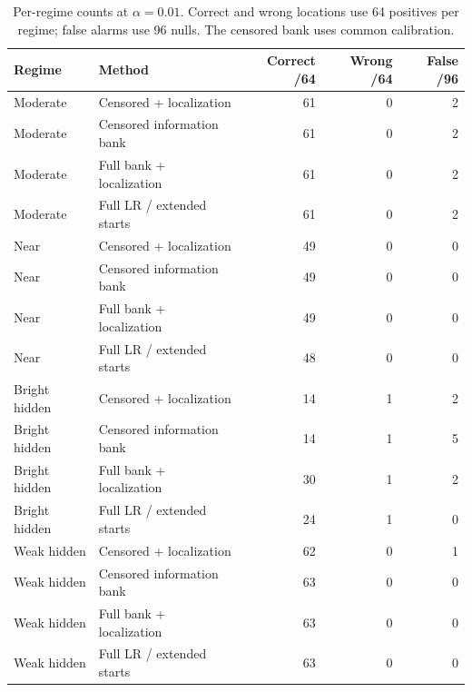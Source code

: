 \begin{table}[t]\centering
\caption{Per-regime counts at $\alpha=0.01$. Correct and wrong locations use 64 positives per regime; false alarms use 96 nulls. The censored bank uses common calibration.}
\label{tab:regime_results}
\begin{tabular}{llrrr}\toprule
Regime & Method & Correct /64 & Wrong /64 & False /96\\\midrule
Moderate & Censored + localization & 61 & 0 & 2\\
Moderate & Censored information bank & 61 & 0 & 2\\
Moderate & Full bank + localization & 61 & 0 & 2\\
Moderate & Full LR / extended starts & 61 & 0 & 2\\
Near & Censored + localization & 49 & 0 & 0\\
Near & Censored information bank & 49 & 0 & 0\\
Near & Full bank + localization & 49 & 0 & 0\\
Near & Full LR / extended starts & 48 & 0 & 0\\
Bright hidden & Censored + localization & 14 & 1 & 2\\
Bright hidden & Censored information bank & 14 & 1 & 5\\
Bright hidden & Full bank + localization & 30 & 1 & 2\\
Bright hidden & Full LR / extended starts & 24 & 1 & 0\\
Weak hidden & Censored + localization & 62 & 0 & 1\\
Weak hidden & Censored information bank & 63 & 0 & 0\\
Weak hidden & Full bank + localization & 63 & 0 & 0\\
Weak hidden & Full LR / extended starts & 63 & 0 & 0\\
\bottomrule\end{tabular}\end{table}
